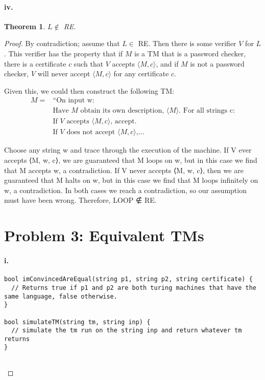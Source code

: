 \documentclass[10pt,letter]{article}
\newtheorem*{thm}{Theorem}
\begin{document}
\paragraph{iv.} \begin{thm} $L \not \in $ RE. \end{thm}
\begin{proof} By contradiction; assume that $L \in$ RE. Then there is some verifier $V$ for $L$. This verifier has the property that if $M$ is a TM that is a password checker, there is a certificate $c$ such that $V$ accepts $\langle M, c \rangle$, and if $M$ is not a password checker, $V$ will never accept $\langle M, c \rangle$ for any certificate $c$.

Given this, we could then construct the following TM:
\begin{align*}
M = &\text{“On input w:}\\
&\text{Have $M$ obtain its own description, $\langle M \rangle$. For all strings c:}\\
&\text{If $V$ accepts $\langle M, c \rangle$, accept.}\\
&\text{If $V$ does not accept $\langle M, c \rangle$,...}
\end{align*}

Choose any string w and trace through the execution of the machine. If V ever accepts ⟨M, w, c⟩, we are guaranteed that M loops on w, but in this case we find that M accepts w, a contradiction. If V never accepts ⟨M, w, c⟩, then we are guaranteed that M halts on w, but in this case we find that M loops infinitely on w, a contradiction.
In both cases we reach a contradiction, so our assumption must have been wrong. Therefore, LOOP ∉ RE.

\section*{Problem 3: Equivalent TMs}

\paragraph{i.} 

\begin{lstlisting}
bool imConvincedAreEqual(string p1, string p2, string certificate) {
  // Returns true if p1 and p2 are both turing machines that have the same language, false otherwise.
}

bool simulateTM(string tm, string inp) {
  // simulate the tm run on the string inp and return whatever tm returns
}


\end{lstlisting}
\end{proof}
\end{document}
